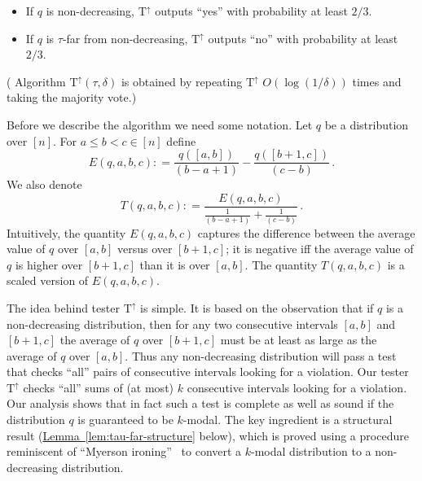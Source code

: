 \documentclass[10pt]{article}
\theoremstyle{definition}
\numberwithin{equation}{section}
\newcommand{\expref}[2]{\texorpdfstring{\hyperref[#2]{#1~\ref{#2}}}{#1~\ref{#2}}}
\newcommand{\TND}{{\mathrm{T^{\uparrow}}}}
\begin{document}
\begin{itemize}
\item If $q$ is non-decreasing, $\TND$ outputs ``yes'' with probability at least $2/3$.
\vspace{-0.1cm}
\item If $q$ is $\tau$-far from non-decreasing, $\TND$ outputs ``no'' with probability at least $2/3$.
\end{itemize}
%
\noindent (%
Algorithm
$\TND(\tau, \delta)$ is obtained by repeating $\TND$ $O(\log(1/\delta))$ times and taking the majority vote.)


\medskip

Before we describe the algorithm we need some notation. Let $q$ be a distribution over $[n]$. 
For $a \le b < c \in [n]$ define $$E(q, a, b, c) : = \frac{q([a,b])}{(b-a+1)} - \frac{q([b+1,c])}{(c-b)}\,.$$
We also denote $$T(q, a, b, c) : = \frac{E(q, a, b, c)}{\frac{1}{(b-a+1)} + \frac{1}{(c-b)}}\,.$$
Intuitively, the quantity $E(q,a,b,c)$ captures the difference
between the average value of $q$ over $[a,b]$ versus over $[b+1,c]$;
it is negative iff the average value of $q$ is higher over $[b+1,c]$
than it is over $[a,b]$.  The quantity $T(q,a,b,c)$ is a scaled
version of $E(q,a,b,c)$.


{The idea behind tester $\TND$ is simple.  It is based on the
observation that if $q$ is a non-decreasing distribution,
then for any two consecutive intervals $[a,b]$ and $[b+1,c]$
the average of $q$ over $[b+1,c]$ must be at least as large
as the average of $q$ over $[a,b]$.  Thus any non-decreasing
distribution will pass a test that checks ``all'' pairs of
consecutive intervals looking for a violation. Our tester $\TND$ checks ``all'' sums of (at most) $k$ consecutive intervals looking for a violation. Our analysis
shows that in fact such a test is complete as well as sound if the
distribution $q$ is guaranteed to be $k$-modal.  The key ingredient
is a structural result (\expref{Lemma}{lem:tau-far-structure} below), which is proved using a procedure
reminiscent of ``Myerson ironing''~\cite{Myerson:81} to convert a $k$-modal
distribution to a non-decreasing distribution.}
\end{document}
